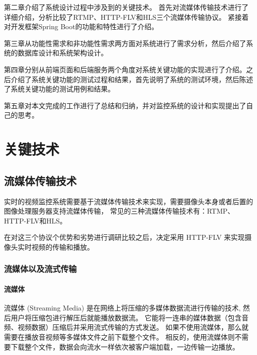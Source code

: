 第二章介绍了系统设计过程中涉及到的关键技术。
首先对流媒体传输技术进行了详细介绍，分析比较了RTMP、HTTP-FLV和HLS三个流媒体传输协议。
紧接着对开发框架Spring Boot的功能和特性进行了介绍。


第三章从功能性需求和非功能性需求两方面对系统进行了需求分析，然后介绍了系统的数据库设计和系统架构设计。

第四章分别从前端页面和后端服务两个角度对系统关键功能的实现进行了介绍。之后介绍了系统关键功能的测试过程和结果，首先说明了系统的测试环境，然后陈述了系统关键功能的测试用例和结果。


第五章对本文完成的工作进行了总结和归纳，并对监控系统的设计和实现提出了自己的思考。

\chapter{关键技术}
\section{流媒体传输技术}
实时的视频监控系统需要基于流媒体传输技术来实现，需要摄像头本身或者后置的图像处理服务器支持流媒体传输，
常见的三种流媒体传输技术有：RTMP、HTTP-FLV和HLS。

在对这三个协议个优势和劣势进行调研比较之后，决定采用
HTTP-FLV 来实现摄像头实时视频的传输和播放。

\subsection{流媒体以及流式传输}
\subsubsection{流媒体}
流媒体 (Streaming Media) 是在网络上将压缩的多媒体数据流进行传输的技术, 然后用户将压缩包进行解压后就能播放数据流\cite{万梅芬2018基于流媒体技术的数字化校园文化设计与实现}。
它能将一连串的媒体数据（包含音频、视频数据）压缩后并采用流式传输的方式发送。
如果不使用流媒体，那么就需要在播放音视频等多媒体文件之前下载整个文件。
相反的，使用流媒体则不需要下载整个文件，数据会向流水一样依次被客户端加载，一边传输一边播放。

